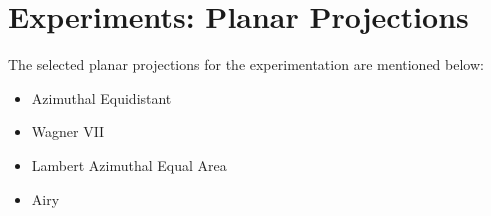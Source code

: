 
\section{Experiments: Planar Projections}
The selected planar projections for the experimentation are mentioned below:
\begin{itemize}
    \item Azimuthal Equidistant
    \item Wagner VII
    \item Lambert Azimuthal Equal Area
    \item Airy
\end{itemize}

